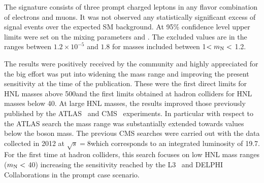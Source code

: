 The signature consists of three prompt charged leptons in any flavor combination of electrons
and muons.
It was not observed any statistically significant excess of signal events over the expected
SM background. At 95\% confidence level upper limits were set on the mixing
parameters \mixpare and \mixparm. The excluded values are in the
ranges between $1.2\times 10^{-5}$ and $1.8$ for masses included
between 1\GeV $< m_\mathrm{N} <$ 1.2\TeV. 

The results were positively received by the community and highly appreciated
for the big effort was put into widening the mass range and
improving the present sensitivity at the time of the publication.
These were the first direct limits for HNL masses above 500\GeV and the first
limits obtained at hadron colliders for HNL masses below 40\GeV.
At large HNL masses, the results improved those previously published
by the ATLAS~\cite{Aad_2015} and CMS~\cite{Khachatryan_2015,Sirunyan:2018xiv}
experiments. In particular with respect to the ATLAS search the mass
range was substantially extended towards values below the \PW boson
mass. The previous CMS searches were carried out with the data
collected in 2012 at $\sqrt{s} = 8$\TeV which corresponds to an
integrated luminosity of 19.7\fbinv. 
For the first time at hadron colliders, this search focuses on low HNL mass ranges
($ m_\mathrm{N} < $ 40\GeV) increasing the sensitivity reached by the
L3~\cite{ACHARD200167} and DELPHI~\cite{Abreu:1996pa} Collaborations
in the prompt case scenario.\\

